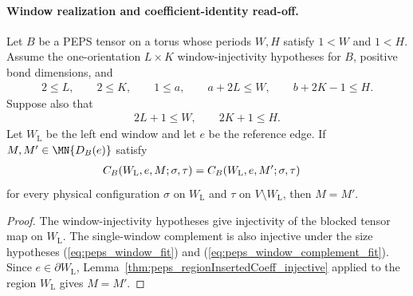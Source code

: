 \paragraph{Window realization and coefficient-identity read-off.}

\begin{lemma}%
    \label{lem:peps_windowRegionInsertedCoeff_injective}
    \leanok
    Let $B$ be a PEPS tensor on a torus whose periods $W,H$ satisfy
    $1<W$ and $1<H$. Assume the one-orientation $L\times K$
    window-injectivity hypotheses for $B$, positive bond dimensions, and
    \begin{align}
        2\le L,\qquad 2\le K,\qquad 1\le a,\qquad
        a+2L\le W,\qquad b+2K-1\le H.
        \label{eq:peps_window_fit}
    \end{align}
    Suppose also that
    \begin{align}
        2L+1\le W,\qquad 2K+1\le H.
        \label{eq:peps_window_complement_fit}
    \end{align}
    Let $W_{\mathrm L}$ be the left end window and let $e$ be the reference
    edge. If $M,M'\in\MN{D_B(e)}$ satisfy
    \begin{align}
        C_B(W_{\mathrm L},e,M;\sigma,\tau)
         & =
        C_B(W_{\mathrm L},e,M';\sigma,\tau)
        \notag
    \end{align}
    for every physical configuration $\sigma$ on $W_{\mathrm L}$ and $\tau$
    on $V\setminus W_{\mathrm L}$, then $M=M'$.
\end{lemma}
\begin{proof}
    \leanok
    The window-injectivity hypotheses give injectivity of the blocked tensor
    map on $W_{\mathrm L}$. The single-window complement is also injective
    under the size hypotheses (\ref{eq:peps_window_fit})
    and (\ref{eq:peps_window_complement_fit}). Since
    $e\in\partial W_{\mathrm L}$,
    Lemma~\ref{thm:peps_regionInsertedCoeff_injective} applied to the
    region $W_{\mathrm L}$ gives $M=M'$.
\end{proof}

